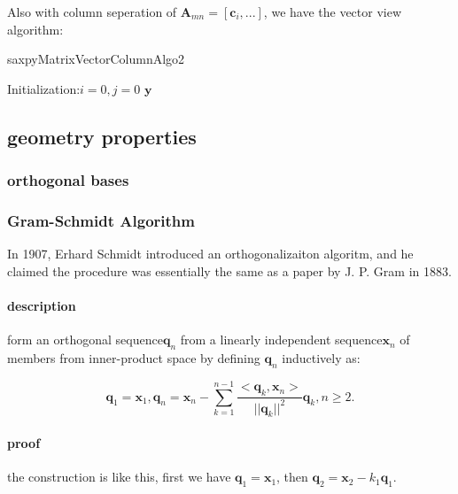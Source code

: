 \documentclass[UTF8]{../../09-Mathematics}
\begin{document}
Also with column seperation of $\boldsymbol A_{mn} = [\boldsymbol c_i, ...]$, we have the vector view algorithm:

\begin{algorithm}[H]
    \caption{saxpyMatrixVectorColumnAlgo2}\label{algo:saxpyMatrixVectorColumnAlgo2}
    \SetAlgoLined
    Initialization:$i=0,j=0$\;
    \KwRet $\boldsymbol y$\;
\end{algorithm}



\subsection{geometry properties}

\subsubsection{orthogonal bases}


\subsubsection{Gram-Schmidt Algorithm}

In 1907, Erhard Schmidt introduced an orthogonalizaiton algoritm, and he claimed the procedure was essentially the same as a paper by J. P. Gram in 1883.

\paragraph{description}
form an orthogonal sequence${\boldsymbol{q}_n}$ from  a linearly independent sequence${\boldsymbol{x}_n}$ of members from inner-product space by defining ${\boldsymbol{q}_n}$ inductively as:

$$
\boldsymbol{q}_1 = \boldsymbol{x}_1,
\boldsymbol{q}_n = \boldsymbol{x}_n - \sum_{k=1}^{n-1}\frac{<\boldsymbol{q}_k,\boldsymbol{x}_n>}{||\boldsymbol{q}_k||^2}\boldsymbol {q}_k, n\geqslant2.
$$


\paragraph{proof}

the construction is like this, first we have 
$\boldsymbol{q}_1 = \boldsymbol{x}_1$, then $\boldsymbol{q}_2 = \boldsymbol{x}_2 - k_1 \boldsymbol{q}_1$.
\end{document}
